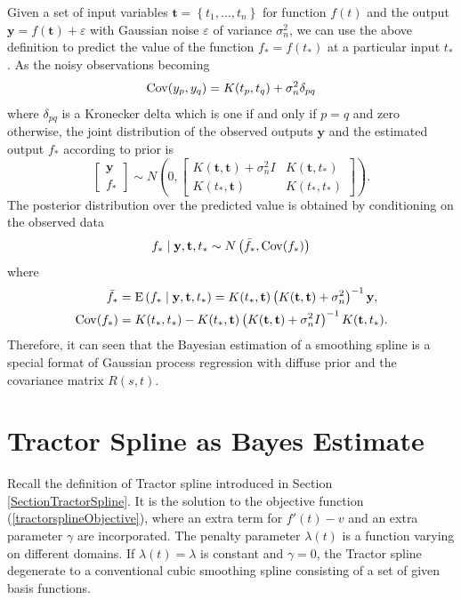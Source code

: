 Given a set of input variables $\mathbf{t} = \left\lbrace t_1,\ldots,t_n\right\rbrace$ for function $f(t)$ and the output $\mathbf{y}=f(\mathbf{t})+\varepsilon$ with \iid  Gaussian noise $\varepsilon$ of variance $\sigma_n^2$,  we can use the above definition to predict the value of the function $f_*=f(t_*)$ at a particular input $t_*$. As the noisy observations becoming
\begin{equation*} %
\Cov (y_p,y_q) = K(t_p,t_q)+\sigma_n^2 \delta_{pq}
\end{equation*}
where $\delta_{pq}$ is a Kronecker delta which is one if and only if $p=q$ and zero otherwise, the joint distribution of the observed outputs $\mathbf{y}$ and the estimated output $f_*$ according to prior is
\begin{equation}
\begin{bmatrix}
\mathbf{y}\\
f_*
\end{bmatrix} \sim N \left(  
0,  \begin{bmatrix}
K(\mathbf{t},\mathbf{t}) +\sigma_n^2I& K(\mathbf{t},t_*) \\
K(t_*,\mathbf{t}) & K(t_*,t_*)
\end{bmatrix} 
\right).
\end{equation}
The posterior distribution over the predicted value is obtained by conditioning on the observed data
\begin{equation*}
f_* \mid  \mathbf{y},\mathbf{t},t_* \sim N\left(\bar{f_*},\mathrm{Cov} (f_*)\right)
\end{equation*}
where 
\begin{align}
\bar{f_*}&=\mathrm{E} \left( f_* \mid  \mathbf{y},\mathbf{t},t_*\right) = K(t_*,\mathbf{t})\left( K(\mathbf{t},\mathbf{t})+\sigma_n^2\right) ^{-1}\mathbf{y},\\
\mathrm{Cov}(f_*)&=K(t_*,t_*)-K(t_*,\mathbf{t})\left( K(\mathbf{t},\mathbf{t})+\sigma_n^2I\right) ^{-1}K(\mathbf{t},t_*).
\end{align}
Therefore, it can seen that the Bayesian estimation of a smoothing spline is a special format of Gaussian process regression with diffuse prior and the covariance matrix $R(s,t)$. 





\section{Tractor Spline as Bayes Estimate}


Recall the definition of Tractor spline introduced in Section \ref{SectionTractorSpline}. It is the solution to the objective function (\ref{tractorsplineObjective}), where an extra term for $f'(t)-v$ and an extra parameter $\gamma$ are incorporated. The penalty parameter $\lambda(t)$ is a function varying on different domains. If $\lambda(t)=\lambda$ is constant and $\gamma=0$, the Tractor spline degenerate to a conventional cubic smoothing spline consisting of a set of given basis functions.  

